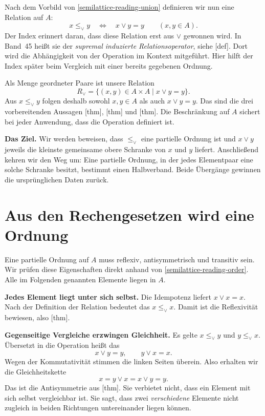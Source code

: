 Nach dem Vorbild von \eqref{semilattice-reading-union} definieren
wir nun eine Relation auf \(A\):
\begin{equation}
  x\leq_\vee y\quad\Longleftrightarrow\quad x\vee y=y
  \qquad(x,y\in A).
  \tag{O}\label{semilattice-reading-order}
\end{equation}
Der Index erinnert daran, dass diese Relation erst aus \(\vee\)
gewonnen wird. In Band~45 heißt sie der \emph{supremal induzierte
Relationsoperator}, siehe [def].
Dort wird die Abhängigkeit von der Operation im Kontext mitgeführt.
Hier hilft der Index später beim Vergleich mit einer bereits
gegebenen Ordnung.

Als Menge geordneter Paare ist unsere Relation
\[
  R_\vee=\{(x,y)\in A\times A\mid x\vee y=y\}.
\]
Aus \(x\leq_\vee y\) folgen deshalb sowohl \(x,y\in A\)
als auch \(x\vee y=y\). Das sind die drei vorbereitenden
Aussagen [thm],
[thm] und
[thm]. Die Beschränkung auf
\(A\) sichert bei jeder Anwendung, dass die Operation definiert ist.

\medskip\noindent\textbf{Das Ziel.}
Wir werden beweisen, dass \(\leq_\vee\) eine partielle Ordnung
ist und \(x\vee y\) jeweils die kleinste gemeinsame obere
Schranke von \(x\) und \(y\) liefert. Anschließend kehren wir
den Weg um: Eine partielle Ordnung, in der jedes Elementpaar
eine solche Schranke besitzt, bestimmt einen Halbverband.
Beide Übergänge gewinnen die ursprünglichen Daten zurück.

\par{}
\section*{Aus den Rechengesetzen wird eine Ordnung}
\hypertarget{semilattice.reading.order}{}

Eine partielle Ordnung auf \(A\) muss reflexiv, antisymmetrisch
und transitiv sein. Wir prüfen diese Eigenschaften direkt anhand
von \eqref{semilattice-reading-order}. Alle im Folgenden genannten
Elemente liegen in \(A\).

\medskip\noindent\textbf{Jedes Element liegt unter sich selbst.}
Die Idempotenz liefert \(x\vee x=x\). Nach der Definition
der Relation bedeutet das \(x\leq_\vee x\). Damit ist die
Reflexivität bewiesen, also
[thm].

\medskip\noindent\textbf{Gegenseitige Vergleiche erzwingen Gleichheit.}
Es gelte \(x\leq_\vee y\) und \(y\leq_\vee x\).
Übersetzt in die Operation heißt das
\[
  x\vee y=y,\qquad y\vee x=x.
\]
Wegen der Kommutativität stimmen die linken Seiten überein.
Also erhalten wir die Gleichheitskette
\[
  x=y\vee x=x\vee y=y.
\]
Das ist die Antisymmetrie aus
[thm]. Sie verbietet
nicht, dass ein Element mit sich selbst vergleichbar ist.
Sie sagt, dass zwei \emph{verschiedene} Elemente nicht zugleich
in beiden Richtungen untereinander liegen können.

